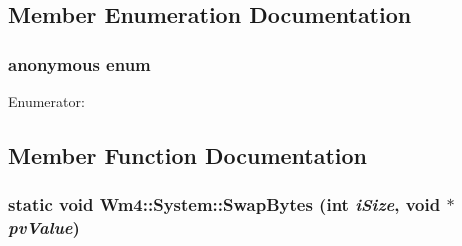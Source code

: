 \subsection{Member Enumeration Documentation}
\subsubsection{\setlength{\rightskip}{0pt plus 5cm}anonymous enum}\label{classWm4_1_1System_7737a7e47a84d48b2227363f47e4fd48}


\begin{Desc}
\item[Enumerator: ]\par
\begin{description}
\item[{\em 
SM\_\-READ\label{classWm4_1_1System_7737a7e47a84d48b2227363f47e4fd4886b04bdaa52a6e54405cb1cb26a3c346}
}]\item[{\em 
SM\_\-WRITE\label{classWm4_1_1System_7737a7e47a84d48b2227363f47e4fd4834a821d0dafc541253bfa7f690603c20}
}]\item[{\em 
SM\_\-READ\_\-WRITE\label{classWm4_1_1System_7737a7e47a84d48b2227363f47e4fd487280e99bb81b1391b371f31a9b0e1c3c}
}]\end{description}
\end{Desc}



\subsection{Member Function Documentation}
\subsubsection{\setlength{\rightskip}{0pt plus 5cm}static void Wm4::System::Swap\-Bytes (int {\em i\-Size}, void $\ast$ {\em pv\-Value})\hspace{0.3cm}{\tt  [static]}}\label{classWm4_1_1System_3e986994800c78c70f2a7f007084754a}


